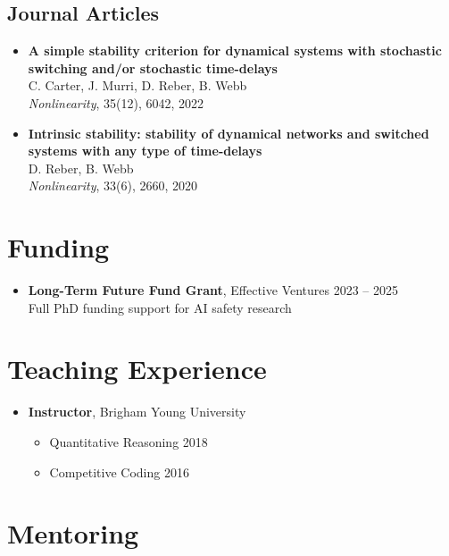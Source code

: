 \documentclass[11pt,letterpaper]{article}
\begin{document}
\subsection*{Journal Articles}

\begin{itemize}[leftmargin=*]
    \item \textbf{A simple stability criterion for dynamical systems with stochastic switching and/or stochastic time-delays} \\
    C. Carter, J. Murri, D. Reber, B. Webb \\
    \textit{Nonlinearity}, 35(12), 6042, 2022
    
    \item \textbf{Intrinsic stability: stability of dynamical networks and switched systems with any type of time-delays} \\
    D. Reber, B. Webb \\
    \textit{Nonlinearity}, 33(6), 2660, 2020
\end{itemize}

\section*{Funding}

\begin{itemize}[leftmargin=*]
    \item \textbf{Long-Term Future Fund Grant}, Effective Ventures \hfill 2023 -- 2025 \\
    Full PhD funding support for AI safety research
\end{itemize}

\section*{Teaching Experience}

\begin{itemize}[leftmargin=*]
    \item \textbf{Instructor}, Brigham Young University
    \begin{itemize}
        \item Quantitative Reasoning \hfill 2018
        \item Competitive Coding \hfill 2016
    \end{itemize}
\end{itemize}

\section*{Mentoring}
\end{document}

